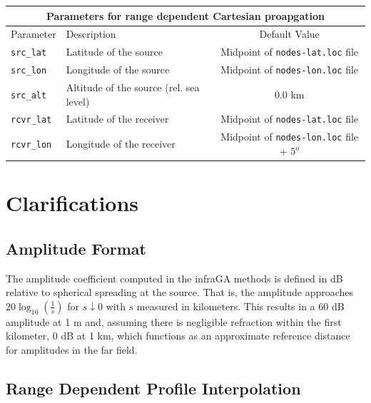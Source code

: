 \documentclass[10pt]{article}
\begin{document}
 \begin{tabular}{ | l | l | c | }
  \hline
  \multicolumn{3}{|c|}{\textbf{Parameters for range dependent Cartesian proapgation}} \\
  \hline
  Parameter & Description & Default Value \\
  \hline \hline
 \verb=src_lat= 			& Latitude of the source 								& Midpoint of \verb=nodes-lat.loc= file \\
 \verb=src_lon= 		& Longitude of the source								& Midpoint of \verb=nodes-lon.loc= file \\
 \verb=src_alt=  		& Altitude of the source (rel. sea level)					& \(0.0\) km \\ \hline
  \verb=rcvr_lat= 		& Latitude of the receiver								& Midpoint of \verb=nodes-lat.loc= file \\
  \verb=rcvr_lon= 		& Longitude of the receiver							& Midpoint of \verb=nodes-lon.loc= file  + \(5^o\) \\ \hline
\end{tabular}
 

\newpage
 \section{Clarifications} 
 \label{Sect:Clarifications}
 \subsection{Amplitude Format}
 \label{Sect:Clarifications:Amplitude}
 
 The amplitude coefficient computed in the infraGA methods is defined in dB relative to spherical spreading at the source.  That is, the amplitude approaches \( 20 \log_{10} \left( \frac{1}{s} \right)\) for \(s\downarrow 0\) with \(s\) measured in kilometers.  This results in a 60 dB amplitude at 1 m and, assuming there is negligible refraction within the first kilometer, 0 dB at 1 km, which functions as an approximate reference distance for amplitudes in the far field.
 
\subsection{Range Dependent Profile Interpolation}
 \label{Sect:Clarifications:RngDep}
\end{document}
